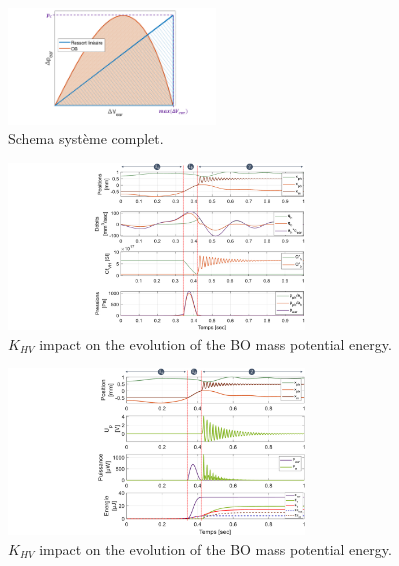 \documentclass[3p,twocolumn,preprint]{elsarticle}
\begin{document}
\begin{figure}[!htbp]
	\centering
	\captionsetup{justification=centering}
	\includegraphics[trim={6cm 1cm 4cm 0.5cm},clip, width=0.49\textwidth]{figures/force_elastique_lineaire_vs_OB.pdf}
	\caption{Schema système complet.}
	\label{fig:force_elastique_lineaire_vs_OB}
\end{figure}
\label{NUMERICAL MODEL AND SIMULATIONS}
\lipsum[1]
\begin{figure}[!htbp]
	\centering
	\captionsetup{justification=centering}
	\includegraphics[trim={9.5cm 0cm 0cm 0cm},clip, width=0.7\textwidth]{figures/simu_pos_debit_Cf_pression_1CYCLE.pdf}
	\caption{$K_{HV}$ impact on the evolution of the BO mass potential energy.}
	\label{fig:simu_pos_debit_Cf_pression_1CYCLE}
\end{figure}
\lipsum[1]
\begin{figure}[!htbp]
	\centering
	\captionsetup{justification=centering}
	\includegraphics[trim={10cm 0cm 0cm 0cm},clip, width=0.7\textwidth]{figures/simu_pos_Up_puissances_energie_1CYCLE.pdf}
	\caption{$K_{HV}$ impact on the evolution of the BO mass potential energy.}
	\label{fig:simu_pos_Up_puissances_energie_1CYCLE}
\end{figure}
\end{document}

